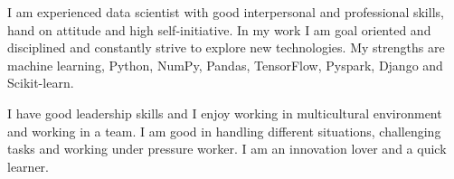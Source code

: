 %
%
%
\par{
    I am experienced data scientist with good interpersonal and professional skills, hand on attitude and high self-initiative. In my work I am goal oriented and disciplined and constantly strive to explore new technologies. My strengths are machine learning, Python, NumPy, Pandas, TensorFlow, Pyspark, Django and Scikit-learn.
    
    I have good leadership skills and I enjoy working in multicultural environment and working in a team. I am good in handling different situations, challenging tasks and  working under pressure worker. I am an innovation lover and a quick learner.
}